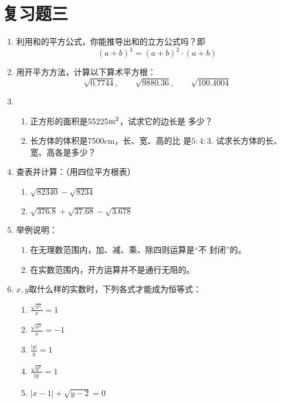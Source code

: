 \section*{复习题三}
\begin{enumerate}
    \item 利用和的平方公式，你能推导出和的立方公式吗？即
    \[(a+b)^3=(a+b)^2\cdot (a+b)\]
    \item 用开平方方法，计算以下算术平方根：
    $$\sqrt{0.7744},\qquad \sqrt{9880.36},\qquad \sqrt{100.4004}$$
  \item 
    \begin{enumerate}
        \item 正方形的面积是55225${\rm m^2}$，试求它的边长是
多少？
\item 长方体的体积是7500cm，长、宽、高的比
是$5:4:3$. 试求长方体的长、宽、高各是多少？
    \end{enumerate}
    
    
\item 查表并计算：（用四位平方根表）
\begin{enumerate}
    \item $\sqrt{82340}-\sqrt{8234}$
    \item $\sqrt{376.8}+\sqrt{37.68} -\sqrt{3.678}$
\end{enumerate}

\item 举例说明：
\begin{enumerate}
    \item 在无理数范围内，加、减、乘、除四则运算是“不
封闭”的。
\item 在实数范围内，开方运算并不是通行无阻的。
\end{enumerate}

\item $x,y$取什么样的实数时，下列各式才能成为恒等式：
\begin{multicols}{2}
    \begin{enumerate}
        \item $\frac{\sqrt{x^2}}{x}=1$
        \item $\frac{\sqrt{x^2}}{x}=-1$
        \item $\frac{|y|}{y}=1$
        \item $\frac{\sqrt{y^2}}{|y|}=1$
        \item $|x-1|+\sqrt{y-2}=0$
    \end{enumerate}
\end{multicols}




\end{enumerate}
